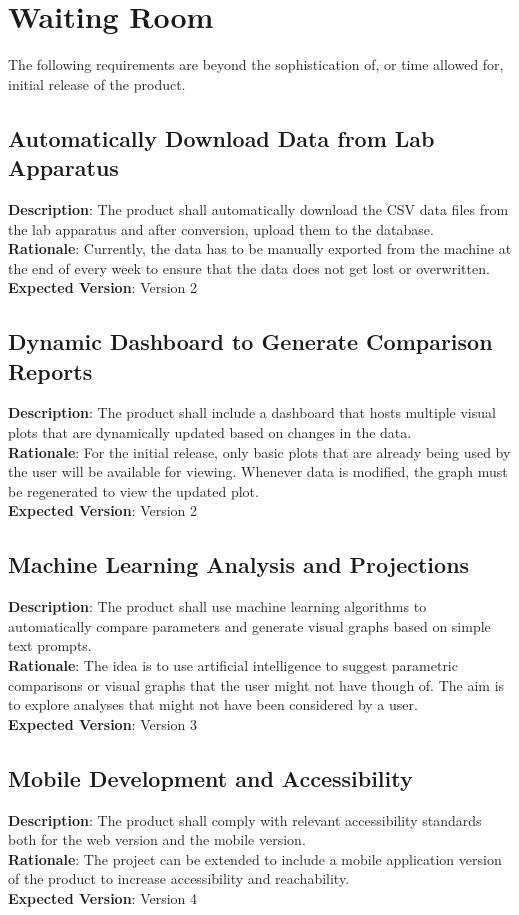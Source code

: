 \documentclass[12pt]{article}
\begin{document}
\section{Waiting Room}
The following requirements are beyond the sophistication of, or time allowed
for, initial release of the product.
\subsection{Automatically Download Data from Lab Apparatus}
\textbf{Description}: The product shall automatically download the CSV data
files from the lab apparatus and after conversion, upload them to the
database.\\
\textbf{Rationale}: Currently, the data has to be manually exported from the
machine at the end of every week to ensure that the data does not get lost or
overwritten.\\
\textbf{Expected Version}: Version 2

\subsection{Dynamic Dashboard to Generate Comparison Reports}
\textbf{Description}: The product shall include a dashboard that hosts multiple
visual plots that are dynamically updated based on changes in the data.\\
\textbf{Rationale}: For the initial release, only basic plots that are already
being used by the user will be available for viewing. Whenever data is modified,
the graph must be regenerated to view the updated plot.\\
\textbf{Expected Version}: Version 2

\subsection{Machine Learning Analysis and Projections}
\textbf{Description}: The product shall use machine learning algorithms to
automatically compare parameters and generate visual graphs based on simple text
prompts.\\
\textbf{Rationale}: The idea is to use artificial intelligence to suggest
parametric comparisons or visual graphs that the user might not have though of.
The aim is to explore analyses that might not have been considered by a user.\\
\textbf{Expected Version}: Version 3

\subsection{Mobile Development and Accessibility}
\textbf{Description}: The product shall comply with relevant accessibility
standards both for the web version and the mobile version.\\
\textbf{Rationale}: The project can be extended to include a mobile application
version of the product to increase accessibility and reachability.\\
\textbf{Expected Version}: Version 4
\end{document}
